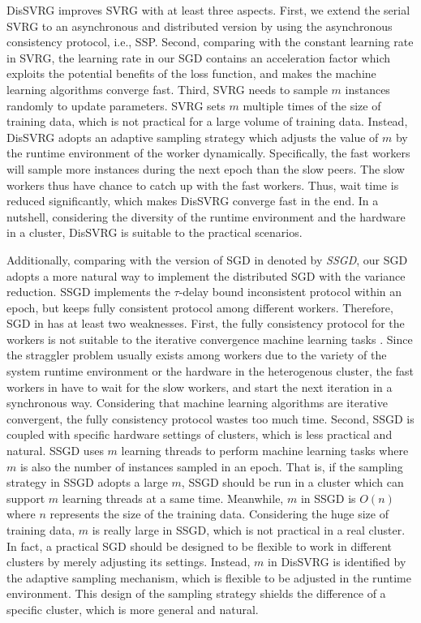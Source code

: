 \documentclass[preprint,review,11pt,a4paper]{elsarticle}
\begin{document}
DisSVRG improves SVRG with at least three aspects. First, we extend the serial SVRG to an asynchronous and distributed version by using the asynchronous consistency protocol, i.e., SSP. Second, comparing with the constant learning rate in SVRG, the learning rate in our SGD contains an acceleration factor which exploits the potential benefits of the loss function, and makes the machine learning algorithms converge fast. Third, SVRG needs to sample $m$ instances randomly to update parameters. SVRG sets $m$ multiple times of the size of training data, which is not practical for a large volume of training data. Instead, DisSVRG adopts an adaptive sampling strategy which adjusts the value of $m$ by the runtime environment of the worker dynamically. Specifically, the fast workers will sample more instances during the next epoch than the slow peers. The slow workers thus have chance to catch up with the fast workers. Thus, wait time is reduced significantly, which makes DisSVRG converge fast in the end. In a nutshell, considering the diversity of the runtime environment and the hardware in a cluster, DisSVRG is suitable to the practical scenarios.

Additionally, comparing with the version of SGD in \cite{Zhang:2015tp} denoted by \emph{SSGD}, our SGD adopts a more natural way to implement the distributed SGD with the variance reduction. SSGD implements the $\tau$-delay bound inconsistent protocol within an epoch, but keeps fully consistent protocol among different workers. Therefore, SGD in \cite{Zhang:2015tp} has at least two weaknesses. First, the fully consistency protocol for the workers is not suitable to the iterative convergence machine learning tasks \cite{2015_dai_high_performance_ml, Li:2014uy, Dai:2013vj}. Since the straggler problem usually exists among workers due to the variety of the system runtime environment or the hardware in the heterogenous cluster, the fast workers in \cite{Zhang:2015tp} have to wait for the slow workers, and start the next iteration in a synchronous way. Considering that machine learning algorithms are iterative convergent, the fully consistency protocol wastes too much time. Second, SSGD is coupled with specific hardware settings of clusters, which is less practical and natural. SSGD uses $m$ learning threads to perform machine learning tasks where $m$ is also the number of instances sampled in an epoch. That is, if the sampling strategy in SSGD adopts a large $m$, SSGD should be run in a cluster which can support $m$ learning threads at a same time. Meanwhile, $m$ in SSGD is $O(n)$ where $n$ represents the size of the training data. Considering the huge size of training data, $m$ is really large in SSGD, which is not practical in a real cluster. In fact, a practical SGD should be designed to be flexible to work in different clusters by merely adjusting its settings. Instead, $m$ in DisSVRG is identified by the adaptive sampling mechanism, which is flexible to be adjusted in the runtime environment. This design of the sampling strategy shields the difference of a specific cluster, which is more general and natural.
\end{document}
